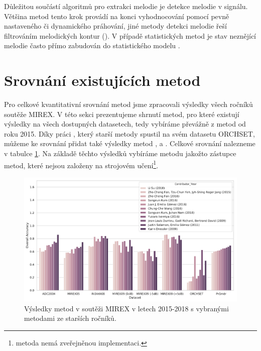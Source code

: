 Důležitou součástí algoritmů pro extrakci melodie je detekce melodie v signálu. Většina metod tento krok provádí na konci vyhodnocování pomocí pevně nastaveného či dynamického práhování, jiné metody detekci melodie řeší filtrováním melodických kontur (\cite{Salamon2012a}). V případě statistických metod je stav neznějící melodie často přímo zabudován do statistického modelu \citep{Ryynanen2008}.

\section{Srovnání existujících metod}

Pro celkové kvantitativní srovnání metod jsme zpracovali výsledky všech ročníků soutěže MIREX. V této sekci prezentujeme shrnutí metod, pro které existují výsledky na všech dostupných datasetech, tedy vybíráme převážně z metod od roku 2015. Díky práci \cite{Bosch2014}, který starší metody spustil na svém datasetu ORCHSET, můžeme ke srovnání přidat také výsledky metod \cite{Dressler2009}, \cite{Salamon2012a} a \cite{Durrieu2010}. Celkové srovnání nalezneme v tabulce \ref{obr:mirex_results}. Na základě těchto výsledků vybíráme metodu \cite{Salamon2012a} jakožto zástupce metod, které nejsou založeny na strojovém učení\footnote{metoda \cite{Dressler2009} nemá zveřejněnou implementaci.}.

\begin{figure}[h]\centering
\includegraphics[width=\textwidth,height=\textheight,keepaspectratio]{../img/mirex_results}
\caption{Výsledky metod v soutěži MIREX v letech 2015-2018 s vybranými metodami ze starších ročníků.}
\label{obr:mirex_results}
\end{figure}

